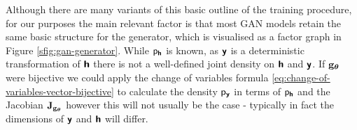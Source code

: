 Although there are many variants of this basic outline of the training procedure, for our purposes the main relevant factor is that most \ac{GAN} models retain the same basic structure for the generator, which is visualised as a factor graph in Figure \ref{sfig:gan-generator}. While $\mathsf{p}_{\boldsymbol{\mathsf{h}}}$ is known, as $\boldsymbol{\mathsf{y}}$ is a deterministic transformation of $\boldsymbol{\mathsf{h}}$ there is not a well-defined joint density on $\boldsymbol{\mathsf{h}}$ and $\boldsymbol{\mathsf{y}}$. If ${\mathbf{g}}_{\boldsymbol{\theta}}$ were bijective we could apply the change of variables formula \eqref{eq:change-of-variables-vector-bijective} to calculate the density $\mathsf{p}_{\boldsymbol{\mathsf{y}}}$ in terms of $\mathsf{p}_{\boldsymbol{\mathsf{h}}}$ and the Jacobian $\mathbf{J}_{{\mathbf{g}}_{\boldsymbol{\theta}}}$ however this will not usually be the case - typically in fact the dimensions of $\boldsymbol{\mathsf{y}}$ and $\boldsymbol{\mathsf{h}}$ will differ.





